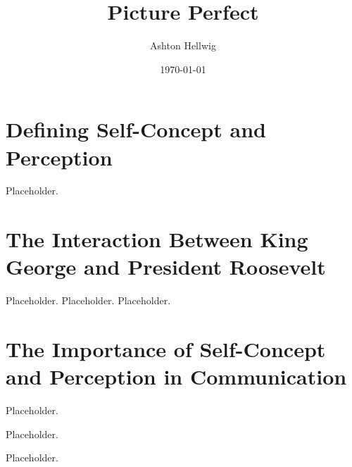 \documentclass[stu,12pt]{apa7}
\title{%
    Picture Perfect
  }
\author{Ashton Hellwig}
\date{\today}
\begin{document}
  \maketitle

  \section{Defining Self-Concept and Perception}
    Placeholder.


  \section{The Interaction Between King George and President Roosevelt}
    Placeholder.
    Placeholder.
    Placeholder.


  \section{The Importance of Self-Concept and Perception in Communication}
    Placeholder.

    Placeholder.

    Placeholder.


  \newpage
  \nocite{michell_hyde_2012}
  \printbibliography[%
    title={Works Cited},%
    heading={bibintoc},%
    notcategory={consulted}%
  ]

  \newpage
  \nocite{*}
  \printbibliography[%
    title={Works Consulted},%
    heading={bibintoc},%
    category={consulted}%
  ]
\end{document}
